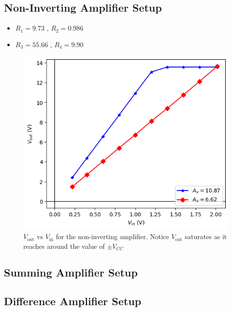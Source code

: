 \subsection{Non-Inverting Amplifier Setup}
    \begin{itemize}
        \item $R_{1}=9.73$ \kohm, $R_{2}=0.986$ \kohm
        \item $R_{3}=55.66$ \kohm, $R_{4}=9.90$ \kohm
    \end{itemize}
    
    \begin{figure}[H]
        \centering
        \includegraphics[width=1\columnwidth]{images/gb.png}
        \caption{$V_\text{out}$ vs $V_\text{in}$ for the non-inverting amplifier. Notice $V_\text{out}$ saturates as it reaches around the value of $\pm V_{CC}$}
        \label{g2}
    \end{figure}

\subsection{Summing Amplifier Setup}
    

\subsection{Difference Amplifier Setup}
    

